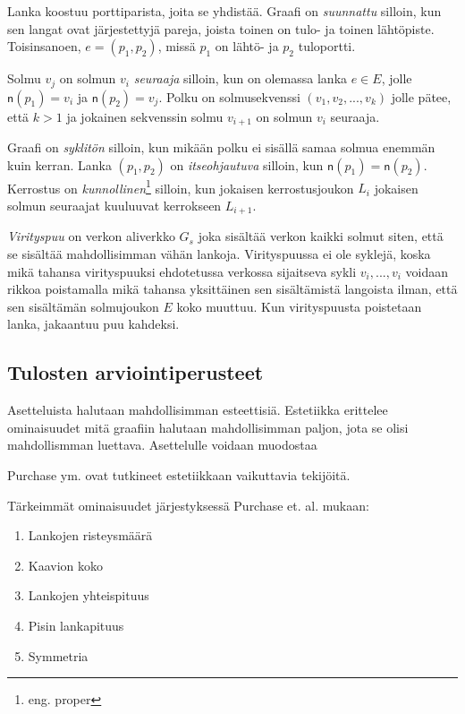 \documentclass[finnish,12pt]{article}
\begin{document}
Lanka koostuu porttiparista, joita se yhdistää. Graafi on \emph{suunnattu} silloin, kun sen langat ovat järjestettyjä pareja, joista toinen on tulo- ja toinen lähtöpiste. Toisinsanoen, $e = (p_1, p_2)$, missä $p_1$ on lähtö- ja $p_2$ tuloportti.

Solmu $v_j$ on solmun $v_i$ \emph{seuraaja} silloin, kun on olemassa lanka $e \in E$, jolle $\mathsf{n}(p_1) = v_i$ ja $\mathsf{n}(p_2) = v_j$.
Polku on solmusekvenssi $(v_1, v_2, ..., v_k)$ jolle pätee, että $k>1$ ja jokainen sekvenssin solmu $v_{i+1}$ on solmun $v_i$ seuraaja.

Graafi on \emph{syklitön} silloin, kun mikään polku ei sisällä samaa solmua enemmän kuin kerran.
Lanka $(p_1, p_2)$ on \emph{itseohjautuva} silloin, kun $\mathsf{n}(p_1) = \mathsf{n}(p_2)$.
Kerrostus on \emph{kunnollinen}\footnote{eng. proper} silloin, kun jokaisen kerrostusjoukon $L_i$ jokaisen solmun seuraajat kuuluuvat kerrokseen $L_{i+1}$.

\emph{Virityspuu} on verkon aliverkko $G_s$ joka sisältää verkon kaikki solmut siten, että se sisältää mahdollisimman vähän lankoja.
Virityspuussa ei ole syklejä, koska mikä tahansa virityspuuksi ehdotetussa verkossa sijaitseva sykli $v_i, ... , v_i$ voidaan rikkoa poistamalla mikä tahansa yksittäinen sen sisältämistä langoista ilman, että sen sisältämän solmujoukon $E$ koko muuttuu.
Kun virityspuusta poistetaan lanka, jakaantuu puu kahdeksi.

 		\subsection{Tulosten arviointiperusteet}

Asetteluista halutaan mahdollisimman esteettisiä.
Estetiikka erittelee ominaisuudet mitä graafiin halutaan mahdollisimman paljon, jota se olisi mahdollismman luettava.
Asettelulle voidaan muodostaa 

Purchase ym. ovat tutkineet estetiikkaan vaikuttavia tekijöitä. \cite{RefWorks:47}

Tärkeimmät ominaisuudet järjestyksessä Purchase et. al. mukaan: 
\begin{enumerate}
  \item Lankojen risteysmäärä
  \item Kaavion koko
  \item Lankojen yhteispituus
  \item Pisin lankapituus
  \item Symmetria
\end{enumerate}
\end{document}
